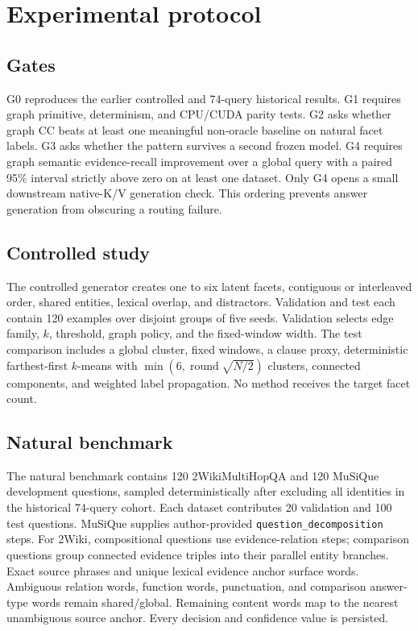 \documentclass[11pt]{article}
\begin{document}
\section{Experimental protocol}
\subsection{Gates}
G0 reproduces the earlier controlled and 74-query historical results. G1 requires graph primitive, determinism, and CPU/CUDA parity tests. G2 asks whether graph CC beats at least one meaningful non-oracle baseline on natural facet labels. G3 asks whether the pattern survives a second frozen model. G4 requires graph semantic evidence-recall improvement over a global query with a paired 95\% interval strictly above zero on at least one dataset. Only G4 opens a small downstream native-K/V generation check. This ordering prevents answer generation from obscuring a routing failure.

\subsection{Controlled study}
The controlled generator creates one to six latent facets, contiguous or interleaved order, shared entities, lexical overlap, and distractors. Validation and test each contain 120 examples over disjoint groups of five seeds. Validation selects edge family, $k$, threshold, graph policy, and the fixed-window width. The test comparison includes a global cluster, fixed windows, a clause proxy, deterministic farthest-first $k$-means with $\min(6,\operatorname{round}\sqrt{N/2})$ clusters, connected components, and weighted label propagation. No method receives the target facet count.

\subsection{Natural benchmark}
The natural benchmark contains 120 2WikiMultiHopQA and 120 MuSiQue development questions, sampled deterministically after excluding all identities in the historical 74-query cohort. Each dataset contributes 20 validation and 100 test questions. MuSiQue supplies author-provided \texttt{question\_decomposition} steps. For 2Wiki, compositional questions use evidence-relation steps; comparison questions group connected evidence triples into their parallel entity branches. Exact source phrases and unique lexical evidence anchor surface words. Ambiguous relation words, function words, punctuation, and comparison answer-type words remain shared/global. Remaining content words map to the nearest unambiguous source anchor. Every decision and confidence value is persisted.
\end{document}
